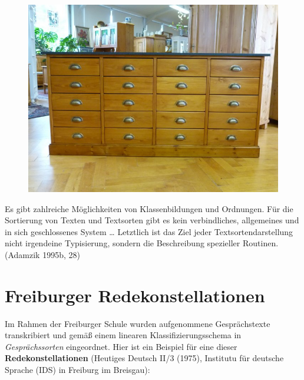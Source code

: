 \documentclass[
  letterpaper,
]{scrbook}
\begin{document}
\begin{figure}

{\centering 

\href{http://antikonline.com/sortiment/kommoden/schubladen-schrank/}{\includegraphics[width=1\textwidth,height=\textheight]{./pictures/schubladenschrank.jpg}}

}

\end{figure}

Es gibt zahlreiche Möglichkeiten von Klassenbildungen und Ordnungen. Für
die Sortierung von Texten und Textsorten gibt es kein verbindliches,
allgemeines und in sich geschlossenes System \ldots{} Letztlich ist das
Ziel jeder Textsortendarstellung nicht irgendeine Typisierung, sondern
die Beschreibung spezieller Routinen. (Adamzik 1995b, 28)

\hypertarget{freiburger-redekonstellationen}{%
\section{Freiburger
Redekonstellationen}\label{freiburger-redekonstellationen}}

Im Rahmen der Freiburger Schule wurden aufgenommene Gesprächstexte
transkribiert und gemäß einem linearen Klassifizierungsschema in
\emph{Gesprächssorten} eingeordnet. Hier ist ein Beispiel für eine
dieser \textbf{Redekonstellationen} (Heutiges Deutsch II/3 (1975),
Institutu für deutsche Sprache (IDS) in Freiburg im Breisgau):
\end{document}
